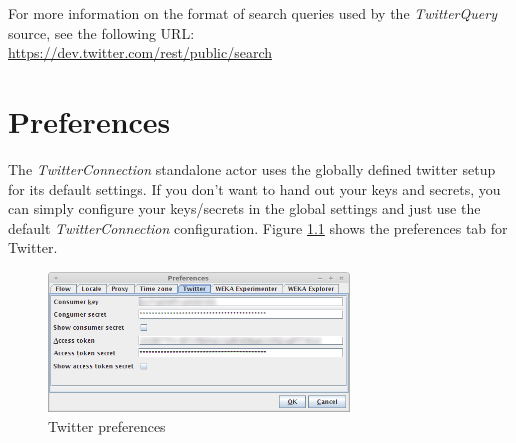 \documentclass[a4paper]{book}
\begin{document}
For more information on the format of search queries used by the
\textit{TwitterQuery} source, see the following URL: \\
\url{https://dev.twitter.com/rest/public/search}{}

\chapter{Preferences}
\label{preferences}
The \textit{TwitterConnection} standalone actor uses the globally defined
twitter setup for its default settings. If you don't want to hand out your
keys and secrets, you can simply configure your keys/secrets in the global
settings and just use the default \textit{TwitterConnection} configuration.
Figure \ref{twitter_preferences} shows the preferences tab for Twitter.
\begin{figure}[htb]
  \centering
  \includegraphics[width=8.0cm]{images/twitter_preferences.png}
  \caption{Twitter preferences}
  \label{twitter_preferences}
\end{figure}


\end{document}
